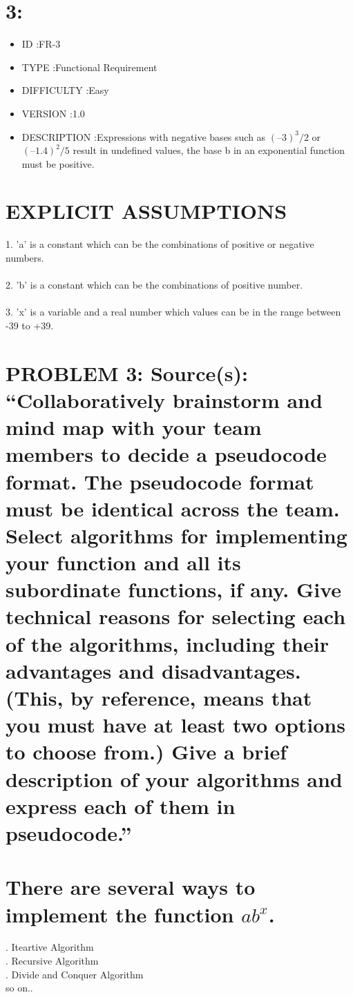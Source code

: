 \documentclass[10pt]{article}
\begin{document}
\section*{3:}
\begin{itemize}
  \item ID			:FR-3
  \item TYPE		:Functional Requirement
  \item DIFFICULTY	:Easy
  \item VERSION		:1.0
  \item DESCRIPTION	:Expressions with negative bases such as $(–3)^3/2$  or  $(–1.4)^2/5$ result in undefined values, the base b in an exponential function must be positive. 
\end{itemize}
\section*{{\normalsize EXPLICIT ASSUMPTIONS}}
1. 'a' is a constant which can be the combinations of positive or negative numbers.\\
\\
2. 'b' is a constant which can be the combinations of positive  number.\\\\
3. 'x' is a variable and a real number which values can be in the range between -39 to +39.
\pagebreak


\section*{{\normalsize PROBLEM 3: Source(s): “Collaboratively brainstorm and mind map with your team members to decide a pseudocode format. The pseudocode format must be identical across the team. Select algorithms for implementing your function and all its subordinate functions, if any.
Give technical reasons for selecting each of the algorithms, including their advantages and disadvantages. (This, by reference, means that you must have at least two options to choose from.)
Give a brief description of your algorithms and express each of them in pseudocode.” }}

\section*{{\normalsize There are several ways to implement the function $ab^x$.}}
. Iteartive Algorithm\\
. Recursive Algorithm\\
. Divide and Conquer Algorithm\\
\quad \quadand so on..
\end{document}
